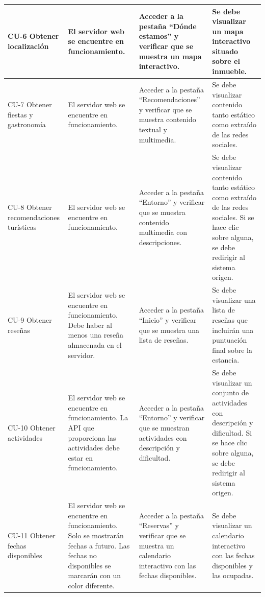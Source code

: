 \begin{longtable}{|p{2.5cm}|p{3.5cm}|p{4.5cm}|p{5cm}|}
CU-6 Obtener localización &
El servidor web se encuentre en funcionamiento. &
Acceder a la pestaña ``Dónde estamos'' y verificar que se muestra un mapa interactivo. &
Se debe visualizar un mapa interactivo situado sobre el inmueble. \\ \hline

CU-7 Obtener fiestas y gastronomía &
El servidor web se encuentre en funcionamiento. &
Acceder a la pestaña ``Recomendaciones'' y verificar que se muestra contenido textual y multimedia. &
Se debe visualizar contenido tanto estático como extraído de las redes sociales. \\ \hline

CU-8 Obtener recomendaciones turísticas &
El servidor web se encuentre en funcionamiento. &
Acceder a la pestaña ``Entorno'' y verificar que se muestra contenido multimedia con descripciones. &
Se debe visualizar contenido tanto estático como extraído de las redes sociales. \newline Si se hace clic sobre alguna, se debe redirigir al sistema origen. \\ \hline

CU-9 Obtener reseñas &
El servidor web se encuentre en funcionamiento. \newline Debe haber al menos una reseña almacenada en el servidor. &
Acceder a la pestaña ``Inicio'' y verificar que se muestra una lista de reseñas. &
Se debe visualizar una lista de reseñas que incluirán una puntuación final sobre la estancia. \\ \hline

CU-10 Obtener actividades &
El servidor web se encuentre en funcionamiento. \newline La API que proporciona las actividades debe estar en funcionamiento. &
Acceder a la pestaña ``Entorno'' y verificar que se muestran actividades con descripción y dificultad. &
Se debe visualizar un conjunto de actividades con descripción y dificultad. \newline Si se hace clic sobre alguna, se debe redirigir al sistema origen. \\ \hline

CU-11 Obtener fechas disponibles &
El servidor web se encuentre en funcionamiento. \newline Solo se mostrarán fechas a futuro. \newline Las fechas no disponibles se marcarán con un color diferente. &
Acceder a la pestaña ``Reservas'' y verificar que se muestra un calendario interactivo con las fechas disponibles. &
Se debe visualizar un calendario interactivo con las fechas disponibles y las ocupadas. \\ \hline


\end{longtable}
